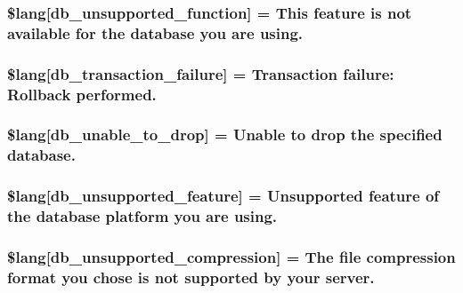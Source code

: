 \subsubsection[{\$lang}]{\setlength{\rightskip}{0pt plus 5cm}\$lang\mbox{[}\textquotesingle{}db\+\_\+unsupported\+\_\+function\textquotesingle{}\mbox{]} = \textquotesingle{}This feature is not available for the database you are using.\textquotesingle{}}\label{db__lang_8php_a77c256be8532e23e8463481f51732116}
\hypertarget{db__lang_8php_a35f225a7ead01f13f8c6423b7c7433a0}{}
\subsubsection[{\$lang}]{\setlength{\rightskip}{0pt plus 5cm}\$lang\mbox{[}\textquotesingle{}db\+\_\+transaction\+\_\+failure\textquotesingle{}\mbox{]} = \textquotesingle{}Transaction failure\+: Rollback performed.\textquotesingle{}}\label{db__lang_8php_a35f225a7ead01f13f8c6423b7c7433a0}
\hypertarget{db__lang_8php_af391f0d50d64cbb95cd733fa947fdb5e}{}
\subsubsection[{\$lang}]{\setlength{\rightskip}{0pt plus 5cm}\$lang\mbox{[}\textquotesingle{}db\+\_\+unable\+\_\+to\+\_\+drop\textquotesingle{}\mbox{]} = \textquotesingle{}Unable to drop the specified database.\textquotesingle{}}\label{db__lang_8php_af391f0d50d64cbb95cd733fa947fdb5e}
\hypertarget{db__lang_8php_ac9a47dcf094e785346ea1834e63df941}{}
\subsubsection[{\$lang}]{\setlength{\rightskip}{0pt plus 5cm}\$lang\mbox{[}\textquotesingle{}db\+\_\+unsupported\+\_\+feature\textquotesingle{}\mbox{]} = \textquotesingle{}Unsupported feature of the database platform you are using.\textquotesingle{}}\label{db__lang_8php_ac9a47dcf094e785346ea1834e63df941}
\hypertarget{db__lang_8php_ae745d23d59478f529442768816df6f36}{}
\subsubsection[{\$lang}]{\setlength{\rightskip}{0pt plus 5cm}\$lang\mbox{[}\textquotesingle{}db\+\_\+unsupported\+\_\+compression\textquotesingle{}\mbox{]} = \textquotesingle{}The file compression format you chose is not supported by your server.\textquotesingle{}}\label{db__lang_8php_ae745d23d59478f529442768816df6f36}
\hypertarget{db__lang_8php_a0519c50a806cec99f29b499aec2582e5}{}
